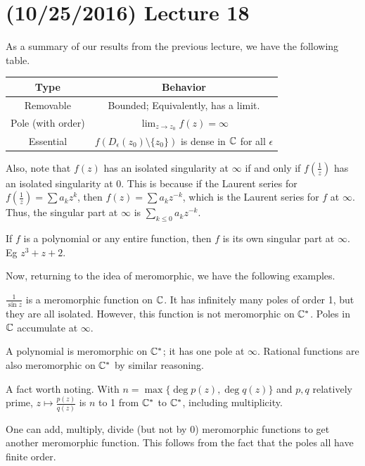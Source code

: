 \documentclass[11pt,leqno,oneside]{amsart}
\begin{document}
  \section{(10/25/2016) Lecture 18}
  As a summary of our results from the previous lecture, we have the
  following table. \\
  \begin{tabular}{|c|c|}
    \hline
    Type & Behavior \\
    \hline
    Removable & Bounded; Equivalently, has a limit. \\
    Pole (with order) & $\lim_{z \to z_0} f(z) = \infty$ \\
    Essential & $f(D_\epsilon(z_0) \setminus \{z_0\})$ is dense in
                ${\mathbb C}$ for all $\epsilon$ \\
    \hline
  \end{tabular}
  Also, note that $f(z)$ has an isolated singularity at $\infty$ if
  and only if $f(\frac{1}{z})$ has an isolated singularity at 0. This
  is because if the Laurent series for $f(\frac{1}{z}) = \sum a_k
  z^k$, then $f(z) = \sum a_k z^{-k}$, which is the Laurent series for
  $f$ at $\infty$. Thus, the singular part at $\infty$ is $\sum_{k
    \leq 0} a_kz^{-k}$.
  \begin{example}
    If $f$ is a polynomial or any entire function, then $f$ is its own
    singular part at $\infty$. Eg $z^3+z+2$. 
  \end{example}
  Now, returning to the idea of meromorphic, we have the following
  examples.
  \begin{example}
    $\frac{1}{\sin z}$ is a meromorphic function on ${\mathbb C}$. It has
    infinitely many poles of order 1, but they are all
    isolated. However, this function is not meromorphic on
    ${\mathbb C}^*$. Poles in ${\mathbb C}$ accumulate at $\infty$. 
  \end{example}
  \begin{example}
    A polynomial is meromorphic on ${\mathbb C}^*$; it has one pole at
    $\infty$. Rational functions are also meromorphic on ${\mathbb C}^*$ by
    similar reasoning.
  \end{example}
  A fact worth noting. With $n = \max\{ \operatorname{deg} p(z),
  \operatorname{deg} q(z) \}$ and $p,q$ relatively prime, $z \mapsto
  \frac{p(z)}{q(z)}$ is $n$ to 1 from ${\mathbb C}^*$ to ${\mathbb C}^*$, including
  multiplicity.
  \begin{rmk}
    One can add, multiply, divide (but not by 0) meromorphic functions
    to get another meromorphic function. This follows from the fact
    that the poles all have finite order.
  \end{rmk}
\end{document}
